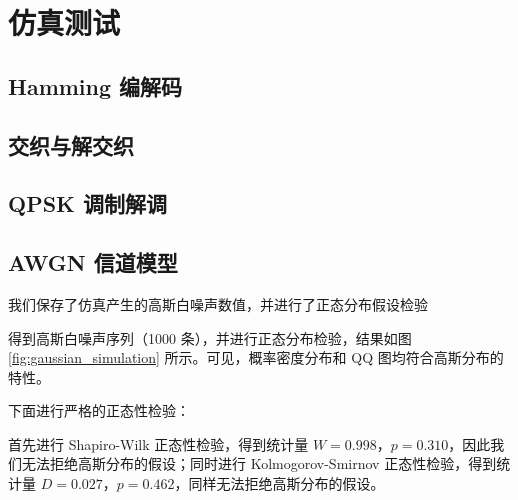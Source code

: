 
\section{仿真测试}

\subsection{Hamming 编解码}



\subsection{交织与解交织}



\subsection{QPSK 调制解调}



\subsection{AWGN 信道模型}

我们保存了仿真产生的高斯白噪声数值，并进行了正态分布假设检验


得到高斯白噪声序列（1000 条），并进行正态分布检验，结果如图 \ref{fig:gaussian_simulation} 所示。可见，概率密度分布和 QQ 图均符合高斯分布的特性。


下面进行严格的正态性检验：

首先进行 Shapiro-Wilk 正态性检验，得到统计量 $W = 0.998$，$p = 0.310$，因此我们无法拒绝高斯分布的假设；同时进行 Kolmogorov-Smirnov 正态性检验，得到统计量 $D = 0.027$，$p = 0.462$，同样无法拒绝高斯分布的假设。


